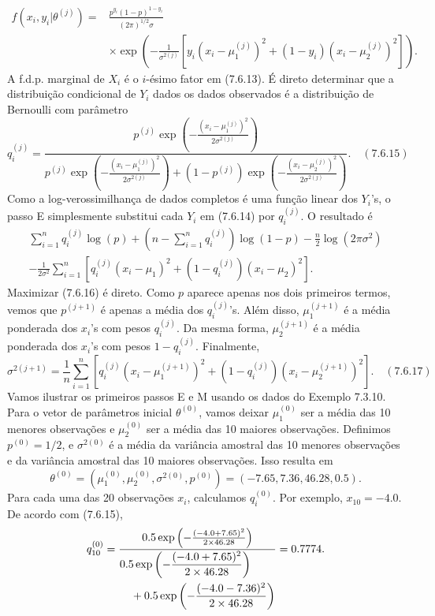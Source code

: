 \begin{equation}
\begin{split}
f(x_i, y_i|\theta^{(j)}) = {} & \frac{p^{y_i}(1-p)^{1-y_i}}{(2\pi)^{1/2}\sigma} \\
& \times \exp\left(-\frac{1}{\sigma^{2(j)}}\left[y_i(x_i-\mu_1^{(j)})^2+(1-y_i)(x_i-\mu_2^{(j)})^2\right]\right).
\end{split}
\end{equation}
A f.d.p. marginal de $X_i$ é o $i$-ésimo fator em (7.6.13). É direto determinar que a distribuição condicional de $Y_i$ dados os dados observados é a distribuição de Bernoulli com parâmetro
$$ q_i^{(j)} = \frac{p^{(j)}\exp\left(-\frac{(x_i-\mu_1^{(j)})^2}{2\sigma^{2(j)}}\right)}{p^{(j)}\exp\left(-\frac{(x_i-\mu_1^{(j)})^2}{2\sigma^{2(j)}}\right) + (1-p^{(j)})\exp\left(-\frac{(x_i-\mu_2^{(j)})^2}{2\sigma^{2(j)}}\right)}. \quad (7.6.15) $$
Como a log-verossimilhança de dados completos é uma função linear dos $Y_i$'s, o passo E simplesmente substitui cada $Y_i$ em (7.6.14) por $q_i^{(j)}$. O resultado é
\begin{multline}
\sum_{i=1}^{n} q_i^{(j)}\log(p) + \left(n - \sum_{i=1}^{n} q_i^{(j)}\right)\log(1-p) - \frac{n}{2}\log(2\pi\sigma^2) \\
- \frac{1}{2\sigma^2}\sum_{i=1}^{n}\left[q_i^{(j)}(x_i-\mu_1)^2+(1-q_i^{(j)})(x_i-\mu_2)^2\right]. \quad \tag{7.6.16}
\end{multline}
Maximizar (7.6.16) é direto. Como $p$ aparece apenas nos dois primeiros termos, vemos que $p^{(j+1)}$ é apenas a média dos $q_i^{(j)}$'s. Além disso, $\mu_1^{(j+1)}$ é a média ponderada dos $x_i$'s com pesos $q_i^{(j)}$. Da mesma forma, $\mu_2^{(j+1)}$ é a média ponderada dos $x_i$'s com pesos $1-q_i^{(j)}$. Finalmente,
$$ \sigma^{2(j+1)} = \frac{1}{n}\sum_{i=1}^{n}\left[q_i^{(j)}(x_i-\mu_1^{(j+1)})^2+(1-q_i^{(j)})(x_i-\mu_2^{(j+1)})^2\right]. \quad (7.6.17) $$
Vamos ilustrar os primeiros passos E e M usando os dados do Exemplo 7.3.10. Para o vetor de parâmetros inicial $\theta^{(0)}$, vamos deixar $\mu_1^{(0)}$ ser a média das 10 menores observações e $\mu_2^{(0)}$ ser a média das 10 maiores observações. Definimos $p^{(0)}=1/2$, e $\sigma^{2(0)}$ é a média da variância amostral das 10 menores observações e da variância amostral das 10 maiores observações. Isso resulta em
$$ \theta^{(0)} = (\mu_1^{(0)}, \mu_2^{(0)}, \sigma^{2(0)}, p^{(0)}) = (-7.65, 7.36, 46.28, 0.5). $$
Para cada uma das 20 observações $x_i$, calculamos $q_i^{(0)}$. Por exemplo, $x_{10}=-4.0$. De acordo com (7.6.15),
\begin{equation}
q_{10}^{(0)} = \frac{0.5\exp\left(-\frac{(-4.0+7.65)^2}{2\times 46.28}\right)}{%
\begin{aligned}
 & 0.5\exp\left(-\frac{(-4.0+7.65)^2}{2\times 46.28}\right) \\
 & \quad + 0.5\exp\left(-\frac{(-4.0-7.36)^2}{2\times 46.28}\right)
\end{aligned}
} = 0.7774.
\end{equation}
